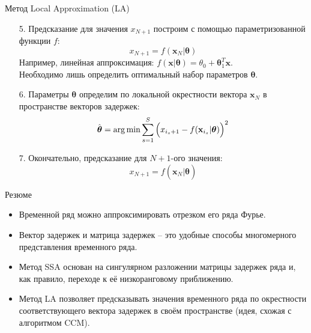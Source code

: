 \begin{frame}{Метод Local Approximation (LA)}

\begin{enumerate}
    \item[5.] Предсказание для значения $x_{N+1}$ построим с помощью параметризованной функции $f$: 
    $$ x_{N+1} = f(\mathbf{x}_N | \boldsymbol{\theta})$$
    Например, линейная аппроксимация: $f(\mathbf{x} |\boldsymbol{\theta}) = \theta_0 + \boldsymbol{\theta}_1^T \mathbf{x}$.\\
    Необходимо лишь определить оптимальный набор параметров $\boldsymbol{\theta}$.
    \item[6.] Параметры $\boldsymbol{\theta}$ определим по локальной окрестности вектора $\mathbf{x}_N$ в пространстве векторов задержек:
    $$ \hat{\boldsymbol{\theta}} = \operatorname*{arg\,min} \sum_{s = 1}^S \Big(x_{i_s + 1} - f(\mathbf{x}_{i_s}|\boldsymbol{\theta}) \Big)^2$$
    \item[7.] Окончательно, предсказание для $N+1$-ого значения:
    $$ x_{N+1} = f(\mathbf{x}_N | \hat{\boldsymbol{\theta}})$$
    
\end{enumerate}

\end{frame}
\begin{frame}{Резюме}
\begin{itemize}
    \item Временной ряд можно аппроксимировать отрезком его ряда Фурье.
    \item Вектор задержек и матрица задержек -- это удобные способы многомерного представления временного ряда.
    \item Метод SSA основан на сингулярном разложении матрицы задержек ряда и, как правило, переходе к её низкоранговому приближению.
    \item Метод LA позволяет предсказывать значения временного ряда по окрестности соответствующего вектора задержек в своём пространстве (идея, схожая с алгоритмом CCM).
\end{itemize}
\end{frame}
 